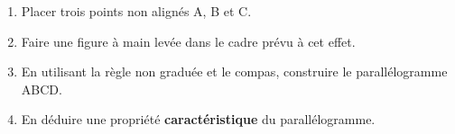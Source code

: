 \begin{activite}
\begin{changemargin}{-10mm}{-40mm}
        \begin{enumerate}
            \item Placer trois points non alignés A, B et C.
            \item Faire une figure à main levée dans le cadre prévu à cet effet.
            \item En utilisant la règle non graduée et le compas, construire le parallélogramme ABCD.
        \end{enumerate}
        \begin{enumerate}
            \setcounter{enumi}{3}
            \item En déduire une propriété \textbf{caractéristique} du parallélogramme.
        \end{enumerate}
    \end{changemargin}
\end{activite}

